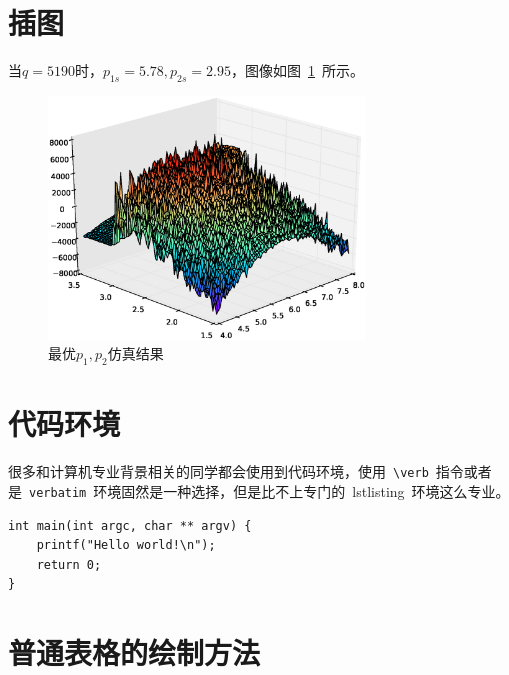 \section{插图}

当$q=5190$时，$p_{1s}=5.78,p_{2s}=2.95$，图像如图~\ref{fig:simuP1P2Result}~所示。
\begin{figure}[htbp!]
\centering
\includegraphics[width=0.75\textwidth]{figures/p1p2figure.eps}
\caption{最优$p_1, p_2$仿真结果}\label{fig:simuP1P2Result}
\vspace{-1em}
\end{figure}

\section{代码环境}

很多和计算机专业背景相关的同学都会使用到代码环境，使用~\verb|\verb|~指令或者是~\verb|verbatim|~环境固然是一种选择，但是比不上专门的~lstlisting~环境这么专业。

\begin{lstlisting}
int main(int argc, char ** argv) {
    printf("Hello world!\n");
    return 0;
}
\end{lstlisting}

\section{普通表格的绘制方法}

